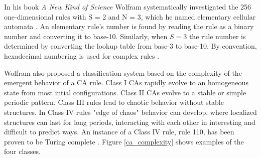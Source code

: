 \documentclass{elsarticle}
\begin{document}
\begin{multicols}{2}
\par In his book \textit{A New Kind of Science} Wolfram systematically 
investigated the 256 one-dimensional rules with S = 2 and N = 3, which he named 
elementary cellular automata \cite{wolfram2002new}. An elementary rule's number 
is found by reading the rule as a binary number and converting it to base-10.  
Similarly, when $S = 3$ the rule number is determined by converting the lookup 
table from base-3 to base-10.
By convention, hexadecimal numbering is used for complex rules 
\cite{wuensche1999classifying}.

Wolfram also proposed a classification system based on the complexity of the 
emergent behavior of a CA rule. Class I CAs rapidly evolve to an homogeneous 
state from most  intial configurations.  Class II CAs evolve to a stable or 
simple periodic pattern.  Class III rules lead to chaotic behavior without 
stable structures.  In Class IV rules "edge of chaos" behavior can develop, 
       where localized structures can last for long periods, interacting with 
       each other in interesting and difficult to predict ways. An instance of 
       a Class IV rule, rule 110, has been proven to be Turing complete 
       \cite{cook2004universality}. Figure \ref{ca_complexity} shows examples 
       of the four classes.  \par


\end{multicols}
\end{document}
